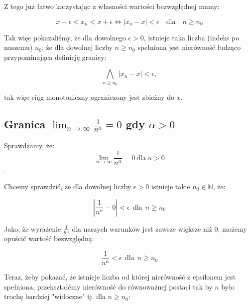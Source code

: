 \documentclass[a4paper,oneside,openright,11pt]{article}
\numberwithin{equation}{section}
\begin{document}
\vspace{10mm}
\noindent
Z tego już łatwo korzystając z własności wartości bezwzględnej mamy:

\begin{equation*}
    x - \epsilon  < x_{n} < x + \epsilon \iff |x_{n} - x| < \epsilon \quad \textrm{dla} \quad n \geq n_0
\end{equation*}


\noindent
Tak więc pokazaliśmy, że dla dowolnego $\epsilon > 0$, istnieje taka liczba (indeks po naszemu) $n_0$, że dla dowolnej liczby $n \geq n_0$
spełniona jest nierówność łudząco przypominająca definicję granicy:

$$  \bigwedge_{n \geq n_0} |x_{n} - x| < \epsilon ,$$

tak więc ciąg monotoniczny ograniczony jest zbieżny do $x$.

\subsection{Granica $\lim_{n\to\infty} \frac{1}{n^\alpha} = 0$ gdy $\alpha > 0$} \label{jedenNadEn}

Sprawdzamy, że: $$\lim_{n\to\infty} \frac{1}{n^ \alpha} = 0 \ \textrm{dla} \ \alpha > 0$$.

\vspace{10mm}

Chcemy sprawdzić, że dla dowolnej liczby $\epsilon > 0$ istnieje takie $n_{0} \in \mathbb{N}$, że:


\begin{equation*}
    |\frac{1}{n^\alpha} - 0| < \epsilon \ \ \textrm{dla} \ \ n \geq n_0
\end{equation*}

\vspace{10mm}

Jako, że wyrażenie $\frac{1}{n^\alpha}$ dla naszych warunków jest zawsze większe niż $0$, możemy opuścić wartość bezwzględną:

\begin{equation*}
    \frac{1}{n^\alpha} < \epsilon \ \ \textrm{dla} \ \ n \geq n_0
\end{equation*}

\vspace{10mm}

Teraz, żeby pokazać, że istnieje liczba od której nierówność z epsilonem jest spełniona, przekształćmy nierówność do równoważnej postaci
tak by $n$ było trochę bardziej "widoczne" tj. dla $n \geq n_0$:
\end{document}
